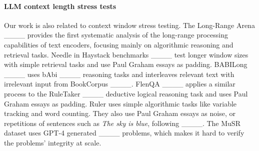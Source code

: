 \paragraph{LLM context length stress tests}  Our work is also related to context window stress testing. The Long-Range Arena ____ provides the first systematic analysis of the long-range processing capabilities of text encoders, focusing mainly on algorithmic reasoning and retrieval tasks. Needle in Haystack benchmarks ____ test longer window sizes with simple retrieval tasks and use Paul Graham essays as padding. BABILong   ____ uses bAbi ____ reasoning tasks and interleaves relevant text with irrelevant input from BookCorpus ____. FlenQA ____ applies a similar process to the RuleTaker ____ deductive logical reasoning task and uses Paul Graham essays as padding. Ruler uses simple algorithmic tasks like variable tracking and word counting. They also use Paul Graham essays as noise, or repetitions of sentences such as \textit{The sky is blue}, following ____. %
The MuSR dataset uses GPT-4 generated ____ problems, which makes it hard to verify the problems' integrity at scale.